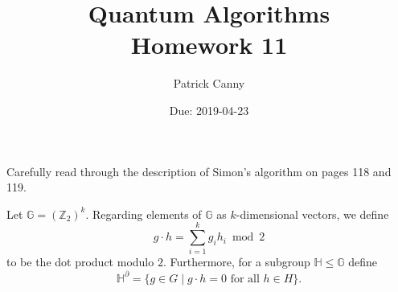 \documentclass{exam} %
\newcommand{\ZZ}{\mathbb{Z}}
\newcommand{\m}[1]{\mathbb{#1}}    %
\theoremstyle{plain}
\theoremstyle{definition}
\theoremstyle{remark}
\numberwithin{equation}{section}  %
\begin{document}
  
\printanswers
\title{Quantum Algorithms \\ Homework 11}
\author{Patrick Canny}
\date{Due: 2019-04-23}
\maketitle
\thispagestyle{foot}

\noindent
Carefully read through the description of Simon's algorithm on pages 118 and
119.

\medskip

\noindent
Let $\m{G} = (\ZZ_2)^k$. Regarding elements of $\m{G}$ as $k$-dimensional
vectors, we define
\[
  g\cdot h
  = \sum_{i=1}^k g_ih_i \bmod 2
\]
to be the dot product modulo $2$. Furthermore, for a subgroup $\m{H}\leq
\m{G}$ define
\[
  \m{H}^{\partial}
  = \big\{ g\in G \mid g\cdot h = 0 \text{ for all } h\in H \big\}.
\]
\end{document}
